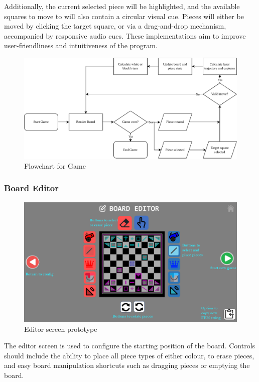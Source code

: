 \documentclass[../main/main.tex]{subfiles}
\begin{document}
Additionally, the current selected piece will be highlighted, and the available squares to move to will also contain a circular visual cue. Pieces will either be moved by clicking the target square, or via a drag-and-drop mechanism, accompanied by responsive audio cues. These implementations aim to improve user-friendliness and intuitiveness of the program.

\begin{figure}[H]
    \centering
    \includegraphics[width=\columnwidth]{../design/assets/game_flowchart.pdf}
    \caption{Flowchart for Game}
    \label{fig:game-flowchart}
\end{figure}

\subsubsection{Board Editor}
\begin{figure}[H]
    \centering
    \includegraphics[width=0.8\columnwidth]{../design/assets/editor_gui.png}
    \caption{Editor screen prototype}
    \label{fig:editor-gui}
\end{figure}

The editor screen is used to configure the starting position of the board. Controls should include the ability to place all piece types of either colour, to erase pieces, and easy board manipulation shortcuts such as dragging pieces or emptying the board.
\end{document}
